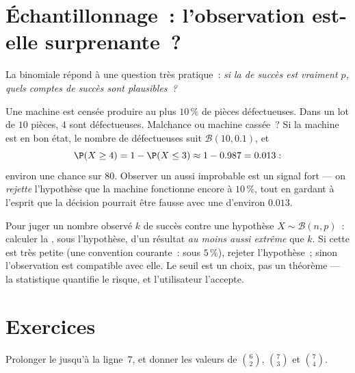 \section{Échantillonnage~: l'observation est-elle surprenante~?}

La  binomiale répond à une question très pratique~: \emph{si la
 de succès est vraiment $p$, quels comptes de succès sont
plausibles~?}

\begin{example}\label{ex:g11:binom:decision}
Une machine est censée produire au plus $10\,\%$ de pièces défectueuses.
Dans un lot de $10$ pièces, $4$ sont défectueuses. Malchance ou machine
cassée~? Si la machine est en bon état, le nombre de défectueuses suit
$\mathcal B(10, 0.1)$, et
\[
\P(X \geq 4) = 1 - \P(X \leq 3) \approx 1 - 0.987 = 0.013 :
\]
environ une chance sur $80$. Observer un  aussi improbable est
un signal fort --- on \emph{rejette} l'hypothèse que la machine fonctionne
encore à $10\,\%$, tout en gardant à l'esprit que la décision pourrait
être fausse avec une  d'environ $0.013$.
\end{example}

\begin{method}\label{met:g11:binom:decision}
Pour juger un nombre observé $k$ de succès contre une hypothèse
$X \sim \mathcal B(n, p)$~: calculer la , sous l'hypothèse,
d'un résultat \emph{au moins aussi extrême} que $k$. Si cette
 est très petite (une convention courante~: sous $5\,\%$),
rejeter l'hypothèse~; sinon l'observation est compatible avec elle. Le
seuil est un choix, pas un théorème --- la statistique quantifie le
risque, et l'utilisateur l'accepte.
\end{method}

\section{Exercices}

\begin{exercise}[$\star$]\label{exo:g11:binom:1}
Prolonger le  jusqu'à la ligne~$7$, et donner les
valeurs de $\binom62$, $\binom{7}{3}$ et $\binom74$.
\end{exercise}

